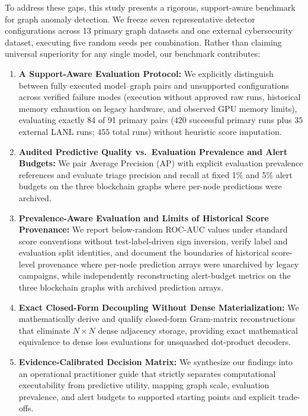 \documentclass[applsci,article,submit,moreauthors,pdftex]{Definitions/mdpi}
\begin{document}
To address these gaps, this study presents a rigorous, support-aware benchmark for graph anomaly detection. We freeze seven representative detector configurations across 13 primary graph datasets and one external cybersecurity dataset, executing five random seeds per combination. Rather than claiming universal superiority for any single model, our benchmark contributes:
\begin{enumerate}
    \item \textbf{A Support-Aware Evaluation Protocol:} We explicitly distinguish between fully executed model--graph pairs and unsupported configurations across verified failure modes (execution without approved raw runs, historical memory exhaustion on legacy hardware, and observed GPU memory limits), evaluating exactly 84 of 91 primary pairs ($420$ successful primary runs plus $35$ external LANL runs; $455$ total runs) without heuristic score imputation.
    \item \textbf{Audited Predictive Quality vs.\ Evaluation Prevalence and Alert Budgets:} We pair Average Precision (AP) with explicit evaluation prevalence references and evaluate triage precision and recall at fixed 1\% and 5\% alert budgets on the three blockchain graphs where per-node predictions were archived.
    \item \textbf{Prevalence-Aware Evaluation and Limits of Historical Score Provenance:} We report below-random ROC-AUC values under standard score conventions without test-label-driven sign inversion, verify label and evaluation split identities, and document the boundaries of historical score-level provenance where per-node prediction arrays were unarchived by legacy campaigns, while independently reconstructing alert-budget metrics on the three blockchain graphs with archived prediction arrays.
    \item \textbf{Exact Closed-Form Decoupling Without Dense Materialization:} We mathematically derive and qualify closed-form Gram-matrix reconstructions that eliminate $N \times N$ dense adjacency storage, providing exact mathematical equivalence to dense loss evaluations for unsquashed dot-product decoders.
    \item \textbf{Evidence-Calibrated Decision Matrix:} We synthesize our findings into an operational practitioner guide that strictly separates computational executability from predictive utility, mapping graph scale, evaluation prevalence, and alert budgets to supported starting points and explicit trade-offs.
\end{enumerate}
\end{document}
